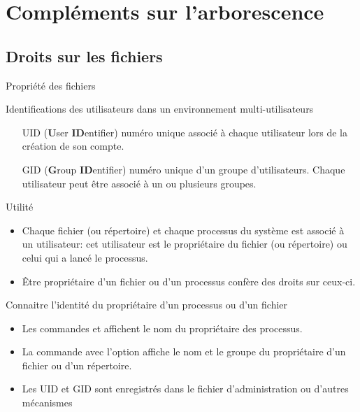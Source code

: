 \section{Compléments sur l'arborescence}
\subsection{Droits sur les fichiers}
\begin{frame}{Propriété des fichiers}
  \begin{block}{Identifications des utilisateurs dans un environnement
      multi-utilisateurs}
    \begin{enumerate}
    \item[UID] (\textbf{U}ser \textbf{ID}entifier) numéro unique associé à
      chaque utilisateur lors de la création de son compte.
    \item[GID] (\textbf{G}roup \textbf{ID}entifier) numéro unique d'un groupe
      d'utilisateurs. Chaque utilisateur peut être associé à un ou plusieurs
      groupes.
    \end{enumerate}
  \end{block}
  \begin{alertblock}{Utilité}
    \begin{itemize}
    \item Chaque fichier (ou répertoire) et chaque processus du système est
      associé à un utilisateur: cet utilisateur est le propriétaire du fichier
      (ou répertoire) ou celui qui a lancé le processus.
    \item Être propriétaire d'un fichier ou d'un processus confère des droits
      sur ceux-ci.
    \end{itemize}
  \end{alertblock}
  \begin{block}{Connaitre l'identité du propriétaire d'un processus ou d'un
      fichier}
    \begin{itemize}
    \item Les commandes  et  affichent le nom du propriétaire
      des processus.
    \item La commande  avec l'option  affiche le nom et le
      groupe du propriétaire d'un fichier ou d'un répertoire.
    \item Les UID et GID sont enregistrés dans le fichier d'administration
       ou d'autres mécanismes
    \end{itemize}
  \end{block}
\end{frame}

